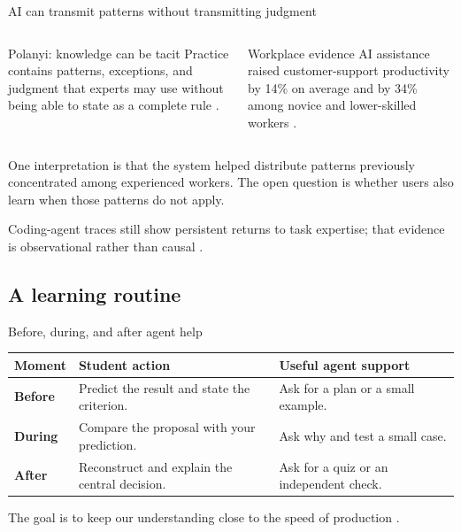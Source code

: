 \begin{frame}{AI can transmit patterns without transmitting judgment}
  \begin{columns}[T,onlytextwidth]
      \begin{block}{Polanyi: knowledge can be tacit}
        Practice contains patterns, exceptions, and judgment that experts may
        use without being able to state as a complete rule
        \citep{polanyi1966tacit}.
      \end{block}
      \begin{block}{Workplace evidence}
        AI assistance raised customer-support productivity by 14\% on average
        and by 34\% among novice and lower-skilled workers
        \citep{brynjolfsson2023work}.
      \end{block}
  \end{columns}

  \vspace{0.55em}
  One interpretation is that the system helped distribute patterns previously
  concentrated among experienced workers. The open question is whether users
  also learn when those patterns do not apply.

  \vfill
  Coding-agent traces still show persistent returns to task expertise; that
  evidence is observational rather than causal \citep{hitzig2026}.
\end{frame}

\subsection{A learning routine}

\begin{frame}{Before, during, and after agent help}
  \small
  \begin{tabularx}{\textwidth}{@{}>{\bfseries}p{2.0cm}p{4.6cm}X@{}}
    \toprule
    Moment & Student action & Useful agent support \\
    \midrule
    Before & Predict the result and state the criterion. & Ask for a plan or a small example. \\
    During & Compare the proposal with your prediction. & Ask why and test a small case. \\
    After & Reconstruct and explain the central decision. & Ask for a quiz or an independent check. \\
    \bottomrule
  \end{tabularx}

  \vfill
  The goal is to keep our understanding close to the speed of production
  \citep{shen2026,litt2026}.
\end{frame}

